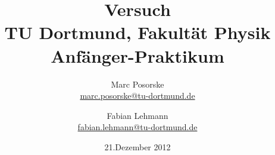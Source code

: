 ﻿%


\renewcommand*\rmdefault{iwona}\normalfont\upshape


\title{Versuch\\				%
\large TU Dortmund, Fakultät Physik\\ 
\normalsize Anfänger-Praktikum}

\author{Marc Posorske\\			%
{\small \href{marc.posorske@tu-dortmund.de}{marc.posorske@tu-dortmund.de}}	%
\and						%
Fabian Lehmann\\					%
{\small \href{fabian.lehmann@tu-dortmund.de}{fabian.lehmann@tu-dortmund.de}}		%
}
\date{21.Dezember 2012}				%





\maketitle					%
\thispagestyle{empty} 				%



\tableofcontents


\newpage					%


